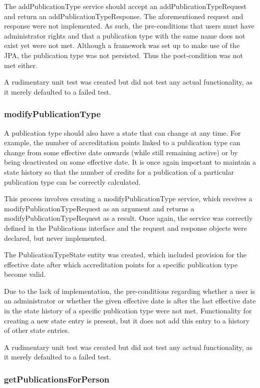\documentclass[a4paper,10pt]{article}
\begin{document}
The addPublicationType service should accept an addPublicationTypeRequest and return an addPublicationTypeResponse. The aforementioned request and response were not implemented. As such, the pre-conditions that users must have administrator rights and that a publication type with the same name does not exist yet were not met. Although a framework was set up to make use of the JPA, the publication type was not persisted. Thus the post-condition was not met either.

A rudimentary unit test was created but did not test any actual functionality, as it merely defaulted to a failed test.

\subsubsection{modifyPublicationType}
A publication type should also have a state that can change at any time. For example, the number of accreditation points linked to a publication type can change from some effective date onwards (while still remaining active) or by being deactivated on some effective date. It is once again important to maintain a state history so that the number of credits for a publication of a particular publication type can be correctly calculated.

This process involves creating a modifyPublicationType service, which receives a modifyPublicationTypeRequest as an argument and returns a modifyPublicationTypeRequest as a result. Once again, the service was correctly defined in the Publications interface and the request and response objects were declared, but never implemented.

The PublicationTypeState entity was created, which included provision for the effective date after which accreditation points for a specific publication type become valid.

Due to the lack of implementation, the pre-conditions regarding whether a user is an administrator or whether the given effective date is after the last effective date in the state history of a specific publication type were not met. Functionality for creating a new state entry is present, but it does not add this entry to a history of other state entries.

A rudimentary unit test was created but did not test any actual functionality, as it merely defaulted to a failed test.

\subsubsection{getPublicationsForPerson}
\end{document}
